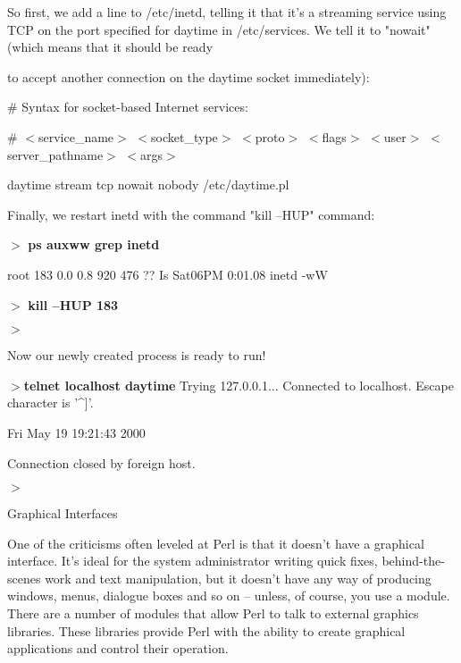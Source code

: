 \documentclass[a4paper,11pt]{book}
\begin{document}
\noindent 

\noindent So first, we add a line to /etc/inetd, telling it that it's a streaming service using TCP on the port specified for daytime in /etc/services. We tell it to "nowait" (which means that it should be ready

\noindent to accept another connection on the daytime socket immediately):

\noindent 

\noindent \# Syntax for socket-based Internet services:

\noindent \# $<$service\_name$>$ $<$socket\_type$>$ $<$proto$>$ $<$flags$>$ $<$user$>$ $<$server\_pathname$>$ $<$args$>$

\noindent daytime stream tcp nowait  nobody /etc/daytime.pl

\noindent 

\noindent Finally, we restart inetd with the command "kill --HUP" command:

\noindent 

\noindent $>$ \textbf{ps auxww \textbar  grep inetd}

\noindent root 183  0.0  0.8   920  476  ??  Is   Sat06PM   0:01.08 inetd -wW

\noindent $>$ \textbf{kill --HUP 183}

\noindent $>$

\noindent 

\noindent 

\noindent Now our newly created process is ready to run!

\noindent 

\noindent $>$\textbf{telnet localhost daytime }Trying 127.0.0.1... Connected to localhost. Escape character is '\^{}]'.

\noindent Fri May 19 19:21:43 2000

\noindent Connection closed by foreign host.

\noindent $>$

\noindent 

\noindent 

\noindent Graphical Interfaces

\noindent 

\noindent One of the criticisms often leveled at Perl is that it doesn't have a graphical interface. It's ideal for the system administrator writing quick fixes, behind-the-scenes work and text manipulation, but it doesn't have any way of producing windows, menus, dialogue boxes and so on -- unless, of course, you use a module. There are a number of modules that allow Perl to talk to external graphics libraries. These libraries provide Perl with the ability to create graphical applications and control their operation.
\end{document}
